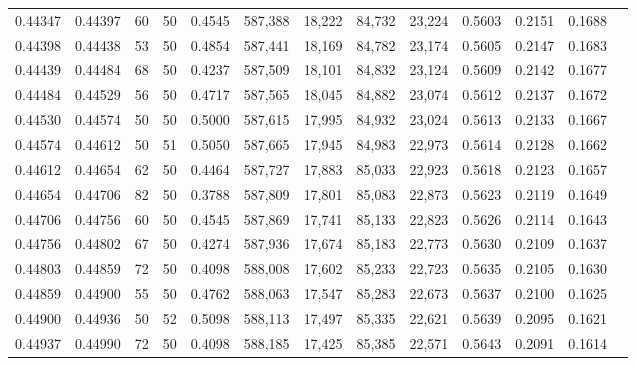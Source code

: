 \begin{tabular}{rrrrrrrrrrrrr}
0.44347 & 0.44397 &    60 &  50 &                                     0.4545 & 587,388 &  18,222 &  84,732 &  23,224 & 0.5603 & 0.2151 & 0.1688 \\
0.44398 & 0.44438 &    53 &  50 &                                     0.4854 & 587,441 &  18,169 &  84,782 &  23,174 & 0.5605 & 0.2147 & 0.1683 \\
0.44439 & 0.44484 &    68 &  50 &                                     0.4237 & 587,509 &  18,101 &  84,832 &  23,124 & 0.5609 & 0.2142 & 0.1677 \\
0.44484 & 0.44529 &    56 &  50 &                                     0.4717 & 587,565 &  18,045 &  84,882 &  23,074 & 0.5612 & 0.2137 & 0.1672 \\
0.44530 & 0.44574 &    50 &  50 &                                     0.5000 & 587,615 &  17,995 &  84,932 &  23,024 & 0.5613 & 0.2133 & 0.1667 \\
0.44574 & 0.44612 &    50 &  51 &                                     0.5050 & 587,665 &  17,945 &  84,983 &  22,973 & 0.5614 & 0.2128 & 0.1662 \\
0.44612 & 0.44654 &    62 &  50 &                                     0.4464 & 587,727 &  17,883 &  85,033 &  22,923 & 0.5618 & 0.2123 & 0.1657 \\
0.44654 & 0.44706 &    82 &  50 &                                     0.3788 & 587,809 &  17,801 &  85,083 &  22,873 & 0.5623 & 0.2119 & 0.1649 \\
0.44706 & 0.44756 &    60 &  50 &                                     0.4545 & 587,869 &  17,741 &  85,133 &  22,823 & 0.5626 & 0.2114 & 0.1643 \\
0.44756 & 0.44802 &    67 &  50 &                                     0.4274 & 587,936 &  17,674 &  85,183 &  22,773 & 0.5630 & 0.2109 & 0.1637 \\
0.44803 & 0.44859 &    72 &  50 &                                     0.4098 & 588,008 &  17,602 &  85,233 &  22,723 & 0.5635 & 0.2105 & 0.1630 \\
0.44859 & 0.44900 &    55 &  50 &                                     0.4762 & 588,063 &  17,547 &  85,283 &  22,673 & 0.5637 & 0.2100 & 0.1625 \\
0.44900 & 0.44936 &    50 &  52 &                                     0.5098 & 588,113 &  17,497 &  85,335 &  22,621 & 0.5639 & 0.2095 & 0.1621 \\
0.44937 & 0.44990 &    72 &  50 &                                     0.4098 & 588,185 &  17,425 &  85,385 &  22,571 & 0.5643 & 0.2091 & 0.1614 \\

\end{tabular}
